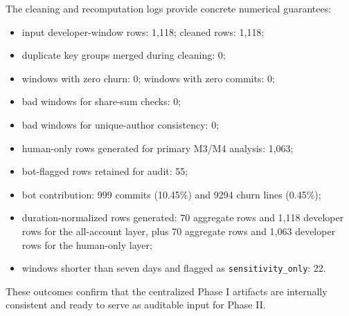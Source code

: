 The cleaning and recomputation logs provide concrete numerical guarantees:
\begin{itemize}[leftmargin=*]
  \item input developer-window rows: 1,118; cleaned rows: 1,118;
  \item duplicate key groups merged during cleaning: 0;
  \item windows with zero churn: 0; windows with zero commits: 0;
  \item bad windows for share-sum checks: 0;
  \item bad windows for unique-author consistency: 0;
  \item human-only rows generated for primary M3/M4 analysis: 1,063;
  \item bot-flagged rows retained for audit: 55;
  \item bot contribution: 999 commits (10.45\%) and 9294 churn lines (0.45\%);
  \item duration-normalized rows generated: 70 aggregate rows and 1,118 developer rows for the all-account layer, plus 70 aggregate rows and 1,063 developer rows for the human-only layer;
  \item windows shorter than seven days and flagged as \texttt{sensitivity\_only}: 22.
\end{itemize}

These outcomes confirm that the centralized Phase I artifacts are internally consistent and ready
to serve as auditable input for Phase II.
